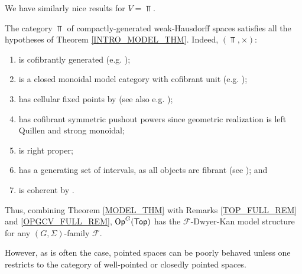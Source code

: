 \documentclass[a4paper,10pt
,draft
]{article}%
\renewcommand{\F}{\mathcal F}
\renewcommand{\1}{\eta}%
\begin{document}
We have similarly nice results for $V = \Top$.
\begin{example}
      The category $\Top$ of compactly-generated weak-Hausdorff spaces satisfies all the hypotheses of Theorem \ref{INTRO_MODEL_THM}.
      Indeed, $(\Top, \times)$:
      \begin{enumerate}[label = (\roman*)]\itemsep-4pt
      \item is cofibrantly generated (e.g. \cite{Pia91});
      \item is a closed monoidal model category with cofibrant unit (e.g. \cite[Prop. 4.2.11]{Hov99});
      \item has cellular fixed points by \cite{Pia91} (see also e.g. \cite[Lemma 3.18]{Ste16});
      \item has cofibrant symmetric pushout powers since geometric realization is left Quillen and strong monoidal;
      \item is right proper;
      \item has a generating set of intervals, as all objects are fibrant (see \cite[Lemma 2.1]{BM13}); and
      \item is coherent by \cite[Lem. 4.16]{BV73}.
      \end{enumerate}
      Thus, combining Theorem \ref{MODEL_THM} with Remarks \ref{TOP_FULL_REM} and \ref{OPGCV_FULL_REM},
      $\mathsf{Op}^G(\mathsf{Top})$ has the $\F$-Dwyer-Kan model structure for any $(G, \Sigma)$-family $\F$. %

      However, as is often the case, pointed spaces can be poorly behaved unless one restricts to the category of well-pointed or closedly pointed spaces. %
\end{example}


\end{document}
